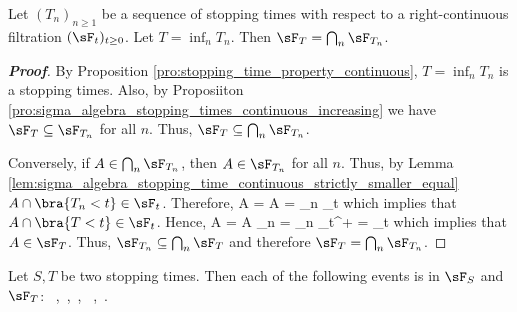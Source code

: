 \begin{proposition}
Let $(T_n)_{n\geq 1}$ be a sequence of stopping times with respect to a right-continuous filtration $(\sF_t)_{t\geq 0}$. Let $T = \inf_n T_n$. Then $\sF_T = \bigcap_n \sF_{T_n}$.
\end{proposition}

\begin{proof}[\bf Proof]
By Proposition \ref{pro:stopping_time_property_continuous}, $T = \inf_n T_n$ is a stopping times. Also, by Proposiiton \ref{pro:sigma_algebra_stopping_times_continuous_increasing} we have $\sF_T \subseteq\sF_{T_n}$ for all $n$. Thus, $\sF_T \subseteq \bigcap_n \sF_{T_n}$.

Conversely, if $A\in \bigcap_n \sF_{T_n}$, then $A\in \sF_{T_n}$ for all $n$. Thus, by Lemma \ref{lem:sigma_algebra_stopping_time_continuous_strictly_smaller_equal} $A\cap \bra{T_n<t}\in \sF_t$. Therefore,
\be
A\cap {} = A \cap {} = \bigcup_n \in \sF_t
\ee
which implies that $A\cap \bra{T<t} \in \sF_t$. Hence,
\be
A\cap {} = A \cap \bigcap_n  = \bigcap_n  \in \sF_{t^+} = \sF_t
\ee
which implies that $A\in \sF_T$. Thus, $\sF_{T_n} \subseteq \bigcap_n \sF_{T}$ and therefore $\sF_T = \bigcap_n \sF_{T_n}$.
\end{proof}

\begin{proposition}
Let $S,T$ be two stopping times. Then each of the following events is in $\sF_S$ and $\sF_T$:
\be
{}\ ,\quad{}\ ,\quad {}\ , \quad {}\  ,\quad{}\ .
\ee
\end{proposition}

